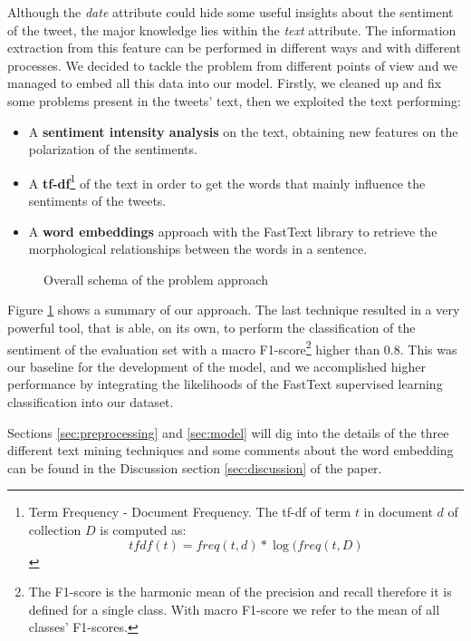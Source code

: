 \documentclass[conference]{IEEEtran}
\begin{document}
Although the \textit{date} attribute could hide some useful insights about the sentiment of the tweet, the major knowledge lies within the \textit{text} attribute. The information extraction from this feature can be performed in different ways and with different processes. We decided to tackle the problem from different points of view and we managed to embed all this data into our model. Firstly, we cleaned up and fix some problems present in the tweets' text, then we exploited the text performing:
\begin{itemize}
    \item A \textbf{sentiment intensity analysis}\cite{sentiment_analysis} on the text, obtaining new features on the polarization of the sentiments.
    \item A \textbf{tf-df}\footnote{Term Frequency - Document Frequency. The tf-df of term $t$ in document $d$ of collection $D$ is computed as: $$tfdf(t) = freq(t,d) * \log(freq(t,D)$$} of the text in order to get the words that mainly influence the sentiments of the tweets.
    \item A \textbf{word embeddings}\cite{wordembeddings} approach with the FastText\cite{fasttext} library to retrieve the morphological relationships between the words in a sentence.
\end{itemize}
\begin{figure}[h]
        \centering
        
        \caption{Overall schema of the problem approach}
        \label{fig:overall_schema}
\end{figure}
Figure \ref{fig:overall_schema} shows a summary of our approach.
The last technique resulted in a very powerful tool, that is able, on its own, to perform the classification of the sentiment of the evaluation set with a macro F1-score\footnote{The F1-score is the harmonic mean of the precision and recall therefore it is defined for a single class. With macro F1-score we refer to the mean of all classes' F1-scores.} higher than 0.8. This was our baseline for the development of the model, and we accomplished higher performance by integrating the likelihoods of the FastText supervised learning classification\cite{fasttextclassifier} into our dataset. 

Sections \ref{sec:preprocessing} and \ref{sec:model} will dig into the details of the three different text mining techniques and some comments about the word embedding can be found in the Discussion section \ref{sec:discussion} of the paper.
\end{document}
